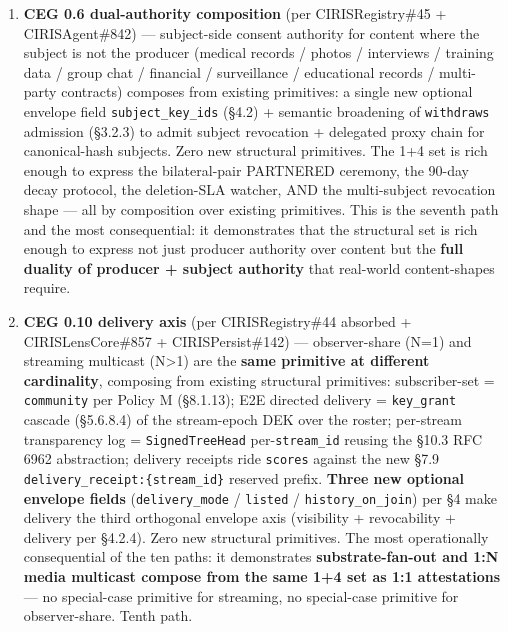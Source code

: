 \documentclass[10pt]{article}
\begin{document}
\begin{enumerate}
\item \textbf{CEG 0.6 dual-authority composition} (per CIRISRegistry\#45 + CIRISAgent\#842) — subject-side consent authority for content where the subject is not the producer (medical records / photos / interviews / training data / group chat / financial / surveillance / educational records / multi-party contracts) composes from existing primitives: a single new optional envelope field \texttt{subject\_key\_ids} (§4.2) + semantic broadening of \texttt{withdraws} admission (§3.2.3) to admit subject revocation + delegated proxy chain for canonical-hash subjects. Zero new structural primitives. The 1+4 set is rich enough to express the bilateral-pair PARTNERED ceremony, the 90-day decay protocol, the deletion-SLA watcher, AND the multi-subject revocation shape — all by composition over existing primitives. This is the seventh path and the most consequential: it demonstrates that the structural set is rich enough to express not just producer authority over content but the \textbf{full duality of producer + subject authority} that real-world content-shapes require.
\item \textbf{CEG 0.10 delivery axis} (per CIRISRegistry\#44 absorbed + CIRISLensCore\#857 + CIRISPersist\#142) — observer-share (N=1) and streaming multicast (N>1) are the \textbf{same primitive at different cardinality}, composing from existing structural primitives: subscriber-set = \texttt{community} per Policy M (§8.1.13); E2E directed delivery = \texttt{key\_grant} cascade (§5.6.8.4) of the stream-epoch DEK over the roster; per-stream transparency log = \texttt{SignedTreeHead} per-\texttt{stream\_id} reusing the §10.3 RFC 6962 abstraction; delivery receipts ride \texttt{scores} against the new §7.9 \texttt{delivery\_receipt:\{stream\_id\}} reserved prefix. \textbf{Three new optional envelope fields} (\texttt{delivery\_mode} / \texttt{listed} / \texttt{history\_on\_join}) per §4 make delivery the third orthogonal envelope axis (visibility + revocability + delivery per §4.2.4). Zero new structural primitives. The most operationally consequential of the ten paths: it demonstrates \textbf{substrate-fan-out and 1:N media multicast compose from the same 1+4 set as 1:1 attestations} — no special-case primitive for streaming, no special-case primitive for observer-share. Tenth path.

\end{enumerate}
\end{document}

